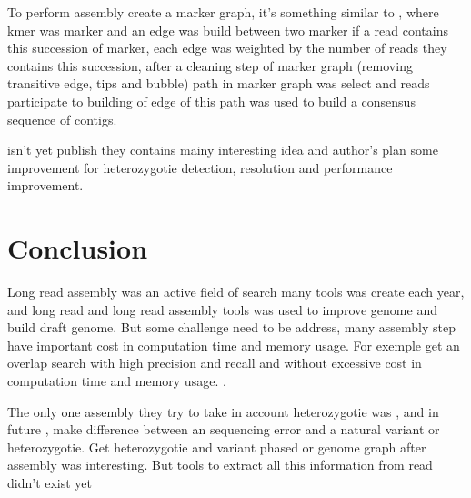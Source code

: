 \documentclass[main]{subfiles}
\begin{document}
To perform assembly \shasta create a marker graph, it's something similar to \DBG, where kmer was marker and an edge was build between two marker if a read contains this succession of marker, each edge was weighted by the number of reads they contains this succession, after a cleaning step of marker graph (removing transitive edge, tips and bubble) path in marker graph was select and reads participate to building of edge of this path was used to build a consensus sequence of contigs.

\shasta isn't yet publish they contains mainy interesting idea and author's plan some improvement for heterozygotie detection, resolution and performance improvement.

\section{Conclusion}


Long read assembly was an active field of search many tools was create each year, and long read and long read assembly tools was used to improve genome and build draft genome.
But some challenge need to be address, many assembly step have important cost in computation time and memory usage. For exemple get an overlap search with high precision and recall and without excessive cost in computation time and memory usage. \cite{bench_ovl}.

The only one assembly they try to take in account heterozygotie was , and in future \shasta, make difference between an sequencing error and a natural variant or heterozygotie. Get heterozygotie and variant phased or genome graph after assembly was interesting. But tools to extract all this information from read didn't exist yet

\end{document}
